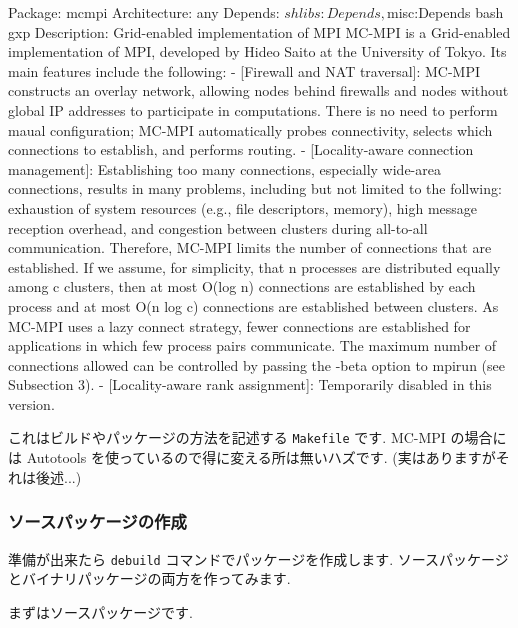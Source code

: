 \documentclass[mingoth,a4paper]{jsarticle}
\begin{document}
\begin{commandline}
\begin{commandline}
Package: mcmpi
Architecture: any
Depends: ${shlibs:Depends}, ${misc:Depends} bash gxp
Description: Grid-enabled implementation of MPI
  MC-MPI is a Grid-enabled implementation of MPI, developed by Hideo
  Saito at the University of Tokyo.  Its main features include the
  following:
  - [Firewall and NAT traversal]: MC-MPI constructs an overlay
    network, allowing nodes behind firewalls and nodes without global
    IP addresses to participate in computations.  There is no need to
    perform maual configuration; MC-MPI automatically probes
    connectivity, selects which connections to establish, and performs
    routing.
  - [Locality-aware connection management]: Establishing too many
    connections, especially wide-area connections, results in many
    problems, including but not limited to the follwing: exhaustion of
    system resources (e.g., file descriptors, memory), high message
    reception overhead, and congestion between clusters during
    all-to-all communication.  Therefore, MC-MPI limits the number of
    connections that are established.  If we assume, for simplicity,
    that n processes are distributed equally among c clusters, then at
    most O(log n) connections are established by each process and at
    most O(n log c) connections are established between clusters.  As
    MC-MPI uses a lazy connect strategy, fewer connections are
    established for applications in which few process pairs
    communicate.  The maximum number of connections allowed can be
    controlled by passing the -beta option to mpirun (see Subsection 3).
  - [Locality-aware rank assignment]: Temporarily disabled in this
    version.
\end{commandline}


これはビルドやパッケージの方法を記述する \verb|Makefile| です.
MC-MPI の場合には Autotools を使っているので得に変える所は無いハズです.
(実はありますがそれは後述...)

\subsubsection{ソースパッケージの作成}

準備が出来たら \verb|debuild| コマンドでパッケージを作成します.
ソースパッケージとバイナリパッケージの両方を作ってみます.

まずはソースパッケージです.



\end{commandline}
\end{document}
